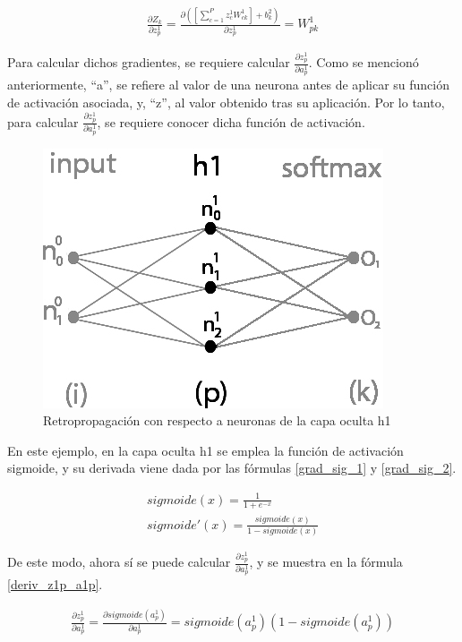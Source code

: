\begin{gather}
	\frac{\partial Z_k}{\partial z^1_p} = \frac{\partial( [\sum_{c=1}^{P} z^1_c   W^1_{ck}] + b^2_k)}{\partial z^1_p} = W^1_{pk}
	\label{deriv_Zk_z1p}
\end{gather}

Para calcular dichos gradientes, se requiere calcular $\frac{\partial z^1_p}{\partial a^1_p}$. Como se mencionó anteriormente, ``a'', se refiere al valor de una neurona antes de aplicar su función de activación asociada, y, ``z'', al valor obtenido tras su aplicación. Por lo tanto, para calcular $\frac{\partial z^1_p}{\partial a^1_p}$, se requiere conocer dicha función de activación.

\begin{figure}[H]
	\centering
	\includegraphics[scale=0.35]{imagenes/nn_1_capa_h1.jpg}  
	\caption{Retropropagación con respecto a neuronas de la capa oculta h1}
	\label{fig:nn_1_capa_h1}
\end{figure}

En este ejemplo, en la capa oculta h1 se emplea la función de activación sigmoide, y su derivada viene dada por las fórmulas \ref{grad_sig_1} y \ref{grad_sig_2}. 

\begin{gather}
	sigmoide(x) = \frac{1}{1+e^{-x}} \label{grad_sig_1} \\
	sigmoide'(x) = \frac{sigmoide(x)}{1-sigmoide(x)} \label{grad_sig_2}
\end{gather}

De este modo, ahora sí se puede calcular $\frac{\partial z^1_p}{\partial a^1_p}$, y se muestra en la fórmula \ref{deriv_z1p_a1p}.

\begin{gather}
	\frac{\partial z^1_ p}{\partial a^1_p} = \frac{\partial sigmoide(a^1_p)}{\partial a^1_p} = sigmoide(a^1_p) (1-sigmoide(a^1_p))
	\label{deriv_z1p_a1p}
\end{gather}

